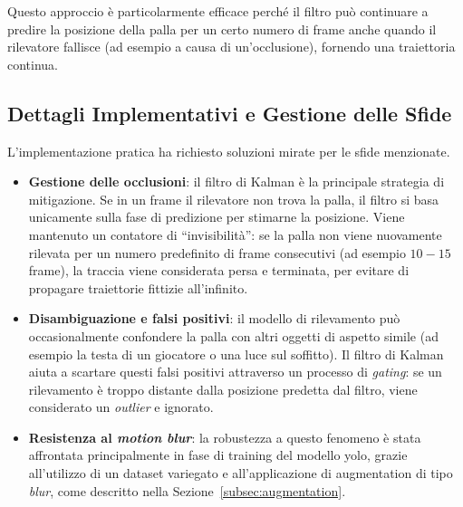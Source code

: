 \documentclass[12pt,a4paper,openright,twoside]{book}
\begin{document}
Questo approccio è particolarmente efficace perché il filtro può continuare a predire la posizione della palla per un certo numero 
di frame anche quando il rilevatore fallisce (ad esempio a causa di un'occlusione), fornendo una traiettoria continua.

\subsection{Dettagli Implementativi e Gestione delle Sfide}
\label{sec:dettagli-implementativi-palla}
L'implementazione pratica ha richiesto soluzioni mirate per le sfide menzionate.

\begin{itemize}
  \item \textbf{Gestione delle occlusioni}: il filtro di Kalman è la principale strategia di mitigazione. Se in un frame il rilevatore 
  non trova la palla, il filtro si basa unicamente sulla fase di predizione per stimarne la posizione. Viene mantenuto un contatore 
  di ``invisibilità'': se la palla non viene nuovamente rilevata per un numero predefinito di frame consecutivi 
  (ad esempio $10-15$ frame), la traccia viene considerata persa e terminata, per evitare di propagare traiettorie fittizie all'infinito.
  \item \textbf{Disambiguazione e falsi positivi}: il modello di rilevamento può occasionalmente confondere la palla con altri oggetti 
  di aspetto simile (ad esempio la testa di un giocatore o una luce sul soffitto). Il filtro di Kalman aiuta a scartare questi falsi positivi 
  attraverso un processo di \emph{gating}: se un rilevamento è troppo distante dalla posizione predetta dal filtro, viene considerato 
  un \emph{outlier} e ignorato.
  \item \textbf{Resistenza al \emph{motion blur}}: la robustezza a questo fenomeno è stata affrontata principalmente in fase di training del 
  modello \ac{yolo}, grazie all'utilizzo di un dataset variegato e all'applicazione di augmentation di tipo \emph{blur}, come descritto nella 
  Sezione~\ref{subsec:augmentation}.
\end{itemize}
\end{document}
